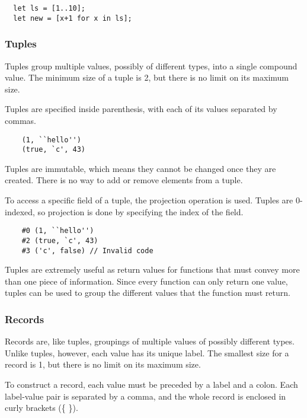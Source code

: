 \documentclass{article}
\begin{document}
\begin{lstlisting}
  let ls = [1..10];
  let new = [x+1 for x in ls];
\end{lstlisting}



\subsubsection{Tuples}

Tuples group multiple values, possibly of different types, into a single compound value.
The minimum size of a tuple is 2, but there is no limit on its maximum size.

Tuples are specified inside parenthesis, with each of its values separated by commas.

\begin{lstlisting}
    (1, ``hello'')
    (true, `c', 43)
\end{lstlisting}

Tuples are immutable, which means they cannot be changed once they are created.
There is no way to add or remove elements from a tuple.

To access a specific field of a tuple, the projection operation is used.
Tuples are 0-indexed, so projection is done by specifying the index of the field.

\begin{lstlisting}
    #0 (1, ``hello'')
    #2 (true, `c', 43)
    #3 ('c', false) // Invalid code
\end{lstlisting}

Tuples are extremely useful as return values for functions that must convey more than one piece of information.
Since every function can only return one value, tuples can be used to group the different values that the function must return.

\subsubsection{Records}

Records are, like tuples, groupings of multiple values of possibly different types.
Unlike tuples, however, each value has its unique label.
The smallest size for a record is 1, but there is no limit on its maximum size.

To construct a record, each value must be preceded by a label and a colon.
Each label-value pair is separated by a comma, and the whole record is enclosed in curly brackets (\{ \}).
\end{document}
